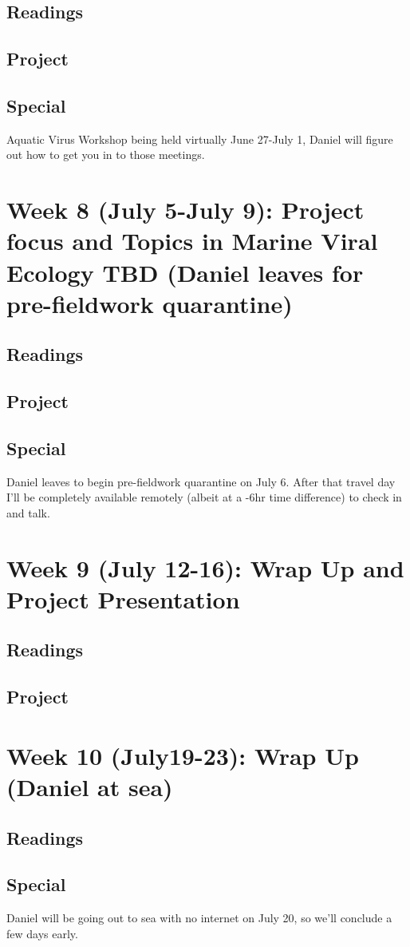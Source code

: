 \documentclass[11pt]{amsart}
\begin{document}
\subsection{Readings}
\subsection{Project}
\subsection{Special} Aquatic Virus Workshop being held virtually June 27-July 1, Daniel will figure out how to get you in to those meetings. 
\section{Week 8 (July 5-July 9): Project focus and Topics in Marine Viral Ecology TBD (Daniel leaves for pre-fieldwork quarantine)}
\subsection{Readings}
\subsection{Project}
\subsection{Special} Daniel leaves to begin pre-fieldwork quarantine on July 6. After that travel day I'll be completely available remotely (albeit at a -6hr time difference) to check in and talk.
\section{Week 9 (July 12-16): Wrap Up and Project Presentation}
\subsection{Readings}
\subsection{Project}
\section{Week 10 (July19-23): Wrap Up (Daniel at sea)}
\subsection{Readings}
\subsection{Special} Daniel will be going out to sea with no internet on July 20, so we'll conclude a few days early. 
\end{document}
